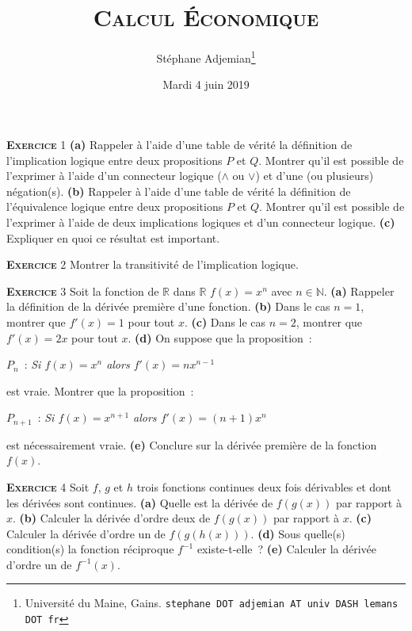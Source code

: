 \documentclass[10pt,a4paper,notitlepage,twocolumn]{article}
\newcommand{\exercise}[1]{\textsc{\textbf{Exercice}} #1}
\newcommand{\question}[1]{\textbf{(#1)}}
\begin{document}
\title{\textsc{Calcul Économique}}
\author{Stéphane Adjemian\thanks{Université du Maine, Gains. \texttt{stephane DOT adjemian AT univ DASH lemans DOT fr}}}
\date{Mardi 4 juin 2019}

\maketitle

\thispagestyle{empty}

\exercise{1} \question{a} Rappeler à l'aide d'une table de vérité la
définition de l'implication logique entre deux propositions $P$ et
$Q$. Montrer qu'il est possible de l'exprimer à l'aide d'un connecteur
logique ($\land$ ou $\lor$) et d'une (ou plusieurs)
négation(s). \question{b} Rappeler à l'aide d'une table de vérité la
définition de l'équivalence logique entre deux propositions $P$ et
$Q$. Montrer qu'il est possible de l'exprimer à l'aide de deux
implications logiques et d'un connecteur logique. \question{c} Expliquer
en quoi ce résultat est important.

\bigskip
  
\exercise{2} Montrer la transitivité de l'implication logique.

\bigskip

\exercise{3} Soit la fonction de $\mathbb R$ dans $\mathbb R$ $f(x) = x^n$ avec $n\in\mathbb N$. \question{a} Rappeler la définition de la dérivée première d'une fonction. \question{b} Dans le cas $n=1$, montrer que $f'(x) = 1$ pour tout $x$. \question{c} Dans le cas $n=2$, montrer que $f'(x) = 2x$ pour tout $x$. \question{d} On suppose que la proposition :
\begin{center}
$P_{n}$ : \textit{Si $f(x)=x^{n}$ alors $f'(x) = n x^{n-1}$}  
\end{center}
est vraie. Montrer que la proposition :
\begin{center}
$P_{n+1}$ : \textit{Si $f(x)=x^{n+1}$ alors $f'(x) = (n+1) x^{n}$}  
\end{center}
 est nécessairement vraie. \question{e} Conclure sur la dérivée première de la fonction $f(x)$.

\bigskip

\exercise{4} Soit $f$, $g$ et $h$ trois fonctions continues deux fois dérivables et dont les dérivées sont continues. \question{a} Quelle est la dérivée de $f(g(x))$ par rapport à $x$. \question{b} Calculer la dérivée d'ordre deux de $f(g(x))$ par rapport à $x$. \question{c} Calculer la dérivée d'ordre un de $f(g(h(x)))$. \question{d} Sous quelle(s) condition(s) la fonction réciproque $f^{-1}$ existe-t-elle ? \question{e} Calculer la dérivée d'ordre un de $f^{-1}(x)$.
\end{document}
